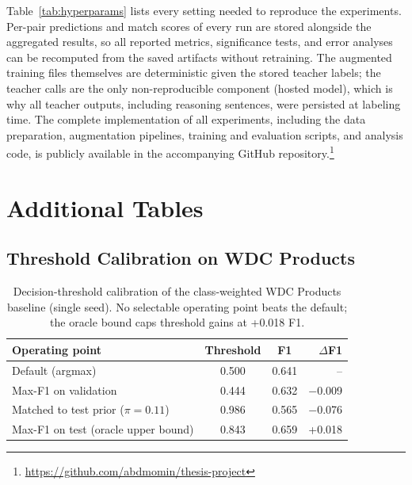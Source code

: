 \documentclass[a4paper,oneside,bibliography=totoc]{scrbook}
\begin{document}
Table~\ref{tab:hyperparams} lists every setting needed to reproduce the experiments. Per-pair predictions and match scores of every run are stored alongside the aggregated results, so all reported metrics, significance tests, and error analyses can be recomputed from the saved artifacts without retraining. The augmented training files themselves are deterministic given the stored teacher labels; the teacher calls are the only non-reproducible component (hosted model), which is why all teacher outputs, including reasoning sentences, were persisted at labeling time. The complete implementation of all experiments, including the data preparation, augmentation pipelines, training and evaluation scripts, and analysis code, is publicly available in the accompanying GitHub repository.\footnote{\url{https://github.com/abdmomin/thesis-project}}

\chapter{Additional Tables}
\label{app:tables}

\section{Threshold Calibration on WDC Products}
\label{app:threshold}

\begin{table}[!htbp]
  \centering
  \begin{tabular}{lccr}
    \toprule
    \textbf{Operating point} & \textbf{Threshold} & \textbf{F1} & \textbf{$\Delta$F1} \\
    \midrule
    Default (argmax) & 0.500 & 0.641 & -- \\
    Max-F1 on validation & 0.444 & 0.632 & $-$0.009 \\
    Matched to test prior ($\pi = 0.11$) & 0.986 & 0.565 & $-$0.076 \\
    Max-F1 on test (oracle upper bound) & 0.843 & 0.659 & +0.018 \\
    \bottomrule
  \end{tabular}
  \caption{Decision-threshold calibration of the class-weighted WDC Products baseline (single seed). No selectable operating point beats the default; the oracle bound caps threshold gains at +0.018 F1.}
  \label{tab:threshold}
\end{table}
\end{document}
